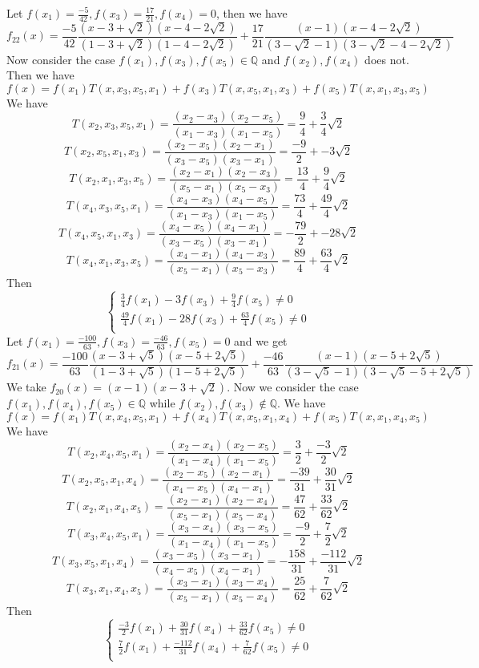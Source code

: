\documentclass[english, 10pt]{article} %
\begin{document}
Let $f(x_1)=\frac{-5}{42}, f(x_3)=\frac{17}{21}, f(x_4) = 0$, then we have
$$f_{22}(x) = \frac{-5}{42} \frac{(x-3+\sqrt{2})(x-4-2\sqrt{2})}{(1-3+\sqrt{2})(1-4-2\sqrt{2})} + \frac{17}{21} \frac{(x-1)(x-4-2\sqrt{2})}{(3-\sqrt{2}-1)(3-\sqrt{2}-4-2\sqrt{2})}$$
Now consider the case $f(x_1),f(x_3),f(x_5) \in \mathbb{Q}$ and $f(x_2),f(x_4)$ does not. Then we have
$$f(x) = f(x_1)T(x,x_3,x_5,x_1)+f(x_3)T(x,x_5,x_1,x_3)+f(x_5)T(x,x_1,x_3,x_5)$$
We have
$$T(x_2,x_3,x_5,x_1) = \frac{(x_2-x_3)(x_2-x_5)}{(x_1-x_3)(x_1-x_5)} = \frac{9}{4}+\frac{3}{4}\sqrt{2}$$
$$T(x_2,x_5,x_1,x_3) = \frac{(x_2-x_5)(x_2-x_1)}{(x_3-x_5)(x_3-x_1)} = \frac{-9}{2}+-3\sqrt{2}$$
$$T(x_2,x_1,x_3,x_5) = \frac{(x_2-x_1)(x_2-x_3)}{(x_5-x_1)(x_5-x_3)}= \frac{13}{4}+\frac{9}{4}\sqrt{2}$$
$$T(x_4,x_3,x_5,x_1) = \frac{(x_4-x_3)(x_4-x_5)}{(x_1-x_3)(x_1-x_5)} = \frac{73}{4}+\frac{49}{4}\sqrt{2}$$
$$T(x_4,x_5,x_1,x_3) = \frac{(x_4-x_5)(x_4-x_1)}{(x_3-x_5)(x_3-x_1)} = -\frac{79}{2}+-28\sqrt{2}$$
$$T(x_4,x_1,x_3,x_5) = \frac{(x_4-x_1)(x_4-x_3)}{(x_5-x_1)(x_5-x_3)}= \frac{89}{4}+\frac{63}{4}\sqrt{2}$$
Then
$$\begin{cases}
\frac{3}{4}f(x_1)-3f(x_3)+\frac{9}{4}f(x_5) \neq 0\\
\frac{49}{4}f(x_1)-28f(x_3)+\frac{63}{4}f(x_5) \neq 0\\
\end{cases}$$
Let $f(x_1)=\frac{-100}{63},f(x_3)=\frac{-46}{63},f(x_5)=0$ and we get
$$f_{21}(x) = \frac{-100}{63} \frac{(x-3+\sqrt{5})(x-5+2\sqrt{5})}{(1-3+\sqrt{5})(1-5+2\sqrt{5})}+\frac{-46}{63} \frac{(x-1)(x-5+2\sqrt{5})}{(3-\sqrt{5}-1)(3-\sqrt{5}-5+2\sqrt{5})}$$
We take $f_{20}(x) = (x-1)(x-3+\sqrt{2})$. Now we consider the case $f(x_1),f(x_4),f(x_5) \in \mathbb{Q}$ while $f(x_2),f(x_3) \not \in \mathbb{Q}$. We have
$$f(x) = f(x_1)T(x,x_4,x_5,x_1)+f(x_4)T(x,x_5,x_1,x_4)+f(x_5)T(x,x_1,x_4,x_5)$$
We have
$$T(x_2,x_4,x_5,x_1) = \frac{(x_2-x_4)(x_2-x_5)}{(x_1-x_4)(x_1-x_5)} = \frac{3}{2}+\frac{-3}{2}\sqrt{2}$$
$$T(x_2,x_5,x_1,x_4) = \frac{(x_2-x_5)(x_2-x_1)}{(x_4-x_5)(x_4-x_1)} = \frac{-39}{31}+\frac{30}{31}\sqrt{2}$$
$$T(x_2,x_1,x_4,x_5) = \frac{(x_2-x_1)(x_2-x_4)}{(x_5-x_1)(x_5-x_4)}= \frac{47}{62}+\frac{33}{62}\sqrt{2}$$
$$T(x_3,x_4,x_5,x_1) = \frac{(x_3-x_4)(x_3-x_5)}{(x_1-x_4)(x_1-x_5)} = \frac{-9}{2}+\frac{7}{2}\sqrt{2}$$
$$T(x_3,x_5,x_1,x_4) = \frac{(x_3-x_5)(x_3-x_1)}{(x_4-x_5)(x_4-x_1)} = -\frac{158}{31}+\frac{-112}{31}\sqrt{2}$$
$$T(x_3,x_1,x_4,x_5) = \frac{(x_3-x_1)(x_3-x_4)}{(x_5-x_1)(x_5-x_4)}= \frac{25}{62}+\frac{7}{62}\sqrt{2}$$
Then
$$\begin{cases}
\frac{-3}{2}f(x_1)+\frac{30}{31}f(x_4)+\frac{33}{62}f(x_5) \neq 0\\
\frac{7}{2}f(x_1)+\frac{-112}{31}f(x_4)+\frac{7}{62}f(x_5) \neq 0\\
\end{cases}$$
\end{document}
